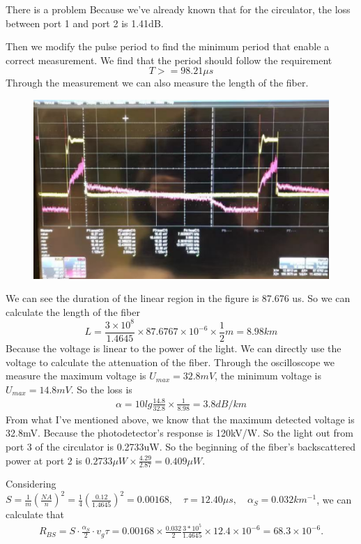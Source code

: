 \documentclass{article}
\begin{document}
	There is a problem
	Because we've already known that for the circulator, the loss between port 1 and port 2 is 1.41dB.
	
	
	Then we modify the pulse period to find the minimum period that enable a correct measurement. We find that the period should follow the requirement
	$$T > = 98.21\mu s$$
	Through the measurement we can also measure the length of the fiber.
	\begin{figure} [H]
		\centering
		\includegraphics[width=0.7\linewidth]{"figure 4"}
		\caption{}
		\label{fig:figure-4}
	\end{figure}
	We can see the duration of the linear region in the figure is 87.676 us. So we can calculate the length of the fiber
	$$L = \frac{3\times 10^8}{1.4645} \times 87.6767 \times 10^{-6}\times \frac{1}{2}m = 8.98 km$$
	Because the voltage is linear to the power of the light. We can directly use the voltage to calculate the attenuation of the fiber. Through the oscilloscope we  measure the maximum voltage is $U_{max} = 32.8mV$, the minimum voltage is $U_{max} = 14.8mV$. So the loss is 
	\begin{align*}
		\alpha = 10 lg\frac{14.8}{32.8} \times \frac{1}{8.98} = 3.8dB/km
	\end{align*}
	From what I've mentioned above, we know that the maximum detected voltage is 32.8mV. Because the photodetector's response is 120kV/W. So the light out from port 3 of the circulator is 0.2733uW. So the beginning of the fiber's backscattered power at port 2 is $0.2733\mu W \times \frac{4.29}{2.87} = 0.409\mu W$.
	
	Considering $S = \frac{1}{m}(\frac{NA}{n})^2 = \frac{1}{4}(\frac{0.12}{1.4645})^2 = 0.00168, \quad \tau = 12.40\mu s , \quad \alpha_S = 0.032km^{-1}$, we can calculate that 
	\begin{align*}
		R_{BS} = S\cdot \frac{\alpha_S}{2}\cdot v_g \tau  = 0.00168 \times \frac{0.032}{2} \frac{3*10^5}{1.4645}\times 12.4\times 10^{-6} = 68.3\times 10^{-6}.
	\end{align*}
\end{document}
